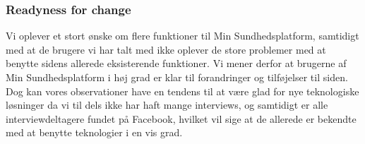 \subsubsection{Readyness for change}
Vi oplever et stort ønske om flere funktioner til Min Sundhedsplatform, samtidigt med at de brugere vi har talt med ikke oplever de store problemer med at benytte sidens allerede eksisterende funktioner. Vi mener derfor at brugerne af Min Sundhedsplatform i høj grad er klar til forandringer og tilføjelser til siden.\\
Dog kan vores observationer have en tendens til at være glad for nye teknologiske løsninger da vi til dels ikke har haft mange interviews, og samtidigt er alle interviewdeltagere fundet på Facebook, hvilket vil sige at de allerede er bekendte med at benytte teknologier i en vis grad.

